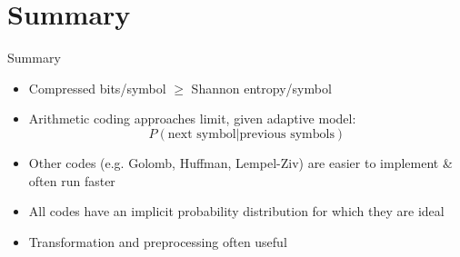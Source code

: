 \documentclass{beamer}
\begin{document}
\section*{Summary}

\begin{frame}{Summary}

  \begin{itemize}
  \item Compressed bits/symbol $\geq$ Shannon entropy/symbol
   \itemb
   \item Arithmetic coding approaches limit, given adaptive model:
\[
P(\mbox{next symbol}|\mbox{previous symbols})
\]
   \item Other codes (e.g. Golomb, Huffman, Lempel-Ziv) are easier to implement \& often run faster
   \item All codes have an implicit probability distribution for which they are ideal
   \iteme
 \item Transformation and preprocessing often useful
 \end{itemize}

\end{frame}
\end{document}
